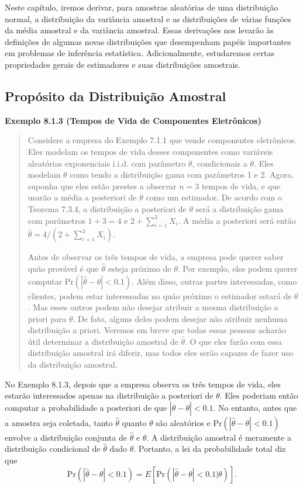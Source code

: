 Neste capítulo, iremos derivar, para amostras aleatórias de uma distribuição normal, a distribuição da variância amostral e as distribuições de várias funções da média amostral e da variância amostral. Essas derivações nos levarão às definições de algumas novas distribuições que desempenham papéis importantes em problemas de inferência estatística. Adicionalmente, estudaremos certas propriedades gerais de estimadores e suas distribuições amostrais.

\subsection*{Propósito da Distribuição Amostral}

\vspace{1em}
\noindent\textbf{Exemplo 8.1.3 (Tempos de Vida de Componentes Eletrônicos)}
\begin{quote}
    Considere a empresa do Exemplo 7.1.1 que vende componentes eletrônicos. Eles modelam os tempos de vida desses componentes como variáveis aleatórias exponenciais i.i.d. com parâmetro $\theta$, condicionais a $\theta$. Eles modelam $\theta$ como tendo a distribuição gama com parâmetros 1 e 2. Agora, suponha que eles estão prestes a observar $n=3$ tempos de vida, e que usarão a média a posteriori de $\theta$ como um estimador. De acordo com o Teorema 7.3.4, a distribuição a posteriori de $\theta$ será a distribuição gama com parâmetros $1+3=4$ e $2+\sum_{i=1}^3 X_i$. A média a posteriori será então $\hat{\theta} = 4/(2+\sum_{i=1}^3 X_i)$.

    Antes de observar os três tempos de vida, a empresa pode querer saber quão provável é que $\hat{\theta}$ esteja próximo de $\theta$. Por exemplo, eles podem querer computar $\text{Pr}(|\hat{\theta} - \theta| < 0.1)$. Além disso, outras partes interessadas, como clientes, podem estar interessadas no quão próximo o estimador estará de $\theta$. Mas esses outros podem não desejar atribuir a mesma distribuição a priori para $\theta$. De fato, alguns deles podem desejar não atribuir nenhuma distribuição a priori. Veremos em breve que todas essas pessoas acharão útil determinar a distribuição amostral de $\hat{\theta}$. O que eles farão com essa distribuição amostral irá diferir, mas todos eles serão capazes de fazer uso da distribuição amostral.
\end{quote}
\vspace{1em}

No Exemplo 8.1.3, depois que a empresa observa os três tempos de vida, eles estarão interessados apenas na distribuição a posteriori de $\theta$. Eles poderiam então computar a probabilidade a posteriori de que $|\hat{\theta} - \theta| < 0.1$. No entanto, antes que a amostra seja coletada, tanto $\hat{\theta}$ quanto $\theta$ são aleatórios e $\text{Pr}(|\hat{\theta} - \theta| < 0.1)$ envolve a distribuição conjunta de $\hat{\theta}$ e $\theta$. A distribuição amostral é meramente a distribuição condicional de $\hat{\theta}$ dado $\theta$. Portanto, a lei da probabilidade total diz que
$$
\text{Pr}(|\hat{\theta} - \theta| < 0.1) = E\left[ \text{Pr}(|\hat{\theta} - \theta| < 0.1 | \theta) \right].
$$

